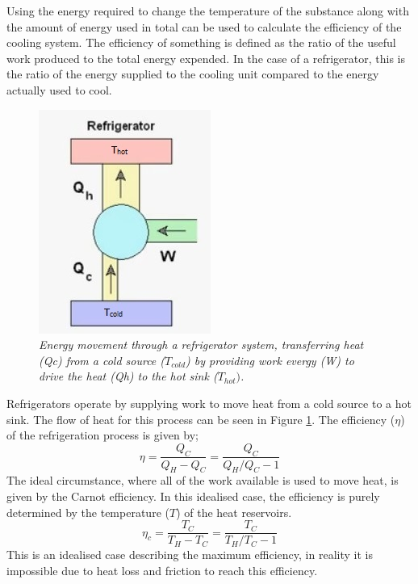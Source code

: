 \documentclass[10pt]{article}
\begin{document}
Using the energy required to change the temperature of the substance along with the amount of energy used in total can be used to calculate the efficiency of the cooling system. The efficiency of something is defined as the ratio of the useful work produced to the total energy expended. In the case of a refrigerator, this is the ratio of the energy supplied to the cooling unit compared to the energy actually used to cool.\\

\begin{figure}[h!]
    \centering
    \includegraphics[scale=.75]{ref.jpg}
    \caption{\it{Energy movement through a refrigerator system, transferring heat (Qc) from a cold source ($T_{cold}$) by providing work evergy (W) to drive the heat (Qh) to the hot sink ($T_{hot})$\cite{fridge}.}}
    \label{fig:fridge}
\end{figure}

Refrigerators operate by supplying work to move heat from a cold source to a hot sink. The flow of heat for this process can be seen in Figure \ref{fig:fridge}. The efficiency ($\eta$) of the refrigeration process is given by;
\begin{equation}\label{eq:eff}
    \eta = \frac{Q_C}{Q_H-Q_C}=\frac{Q_C}{Q_H/Q_C - 1}
\end{equation}
The ideal circumstance, where all of the work available is used to move heat, is given by the Carnot efficiency\cite{carnot}. In this idealised case, the efficiency is purely determined by the temperature ($T$) of the heat reservoirs.
\begin{equation}\label{eq:carn_eff}
        \eta_c = \frac{T_C}{T_H-T_C}=\frac{T_C}{T_H/T_C - 1}
\end{equation}
This is an idealised case describing the maximum efficiency, in reality it is impossible due to heat loss and friction to reach this efficiency. 
\end{document}
